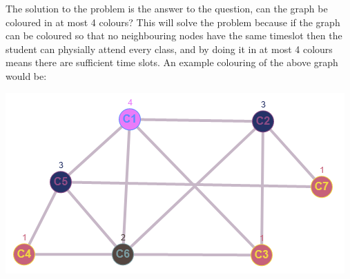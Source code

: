 \documentclass{article}
\begin{document}
The solution to the problem is the answer to the question, can the graph be coloured in at most 4 colours?
\newline
This will solve the problem because if the graph can be coloured so that no neighbouring nodes have the same timeslot then the student can physially attend every class, and by doing it in at most 4 colours means there are sufficient time slots.
\newline
An example colouring of the above graph would be:
\begin{center}
\includegraphics{a31C}
\end{center}
\end{document}
